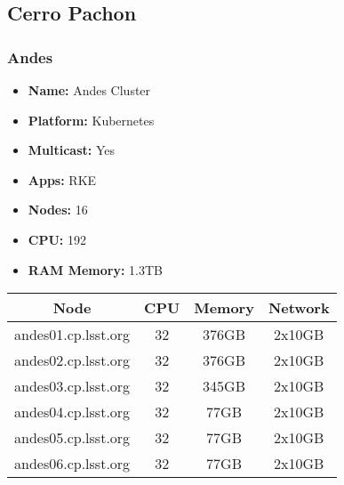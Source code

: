 \newpage
\subsection{Cerro Pachon}
\subsubsection{Andes}
\begin{itemize}
  \itemsep0em 
  \item \textbf{Name:}       Andes Cluster
  \item \textbf{Platform:}   Kubernetes
  \item \textbf{Multicast:}  Yes
  \item \textbf{Apps:}       RKE
  \item \textbf{Nodes:}      16
  \item \textbf{CPU:}        192
  \item \textbf{RAM Memory:} 1.3TB
\end{itemize}
\begin{center}
  \small
  \begin{tabular}{||c c c c||} 
    \hline
    \textbf{Node} & \textbf{CPU} & \textbf{Memory} & \textbf{Network} \\ [0.5ex]
    \hline
    andes01.cp.lsst.org & 32 & 376GB & 2x10GB \\
    \hline
    andes02.cp.lsst.org & 32 & 376GB & 2x10GB \\
    \hline
    andes03.cp.lsst.org & 32 & 345GB & 2x10GB \\
    \hline
    andes04.cp.lsst.org & 32 & 77GB & 2x10GB \\
    \hline
    andes05.cp.lsst.org & 32 & 77GB & 2x10GB \\
    \hline
    andes06.cp.lsst.org & 32 & 77GB & 2x10GB \\
    \hline
  \end{tabular}
\end{center}

\newpage
